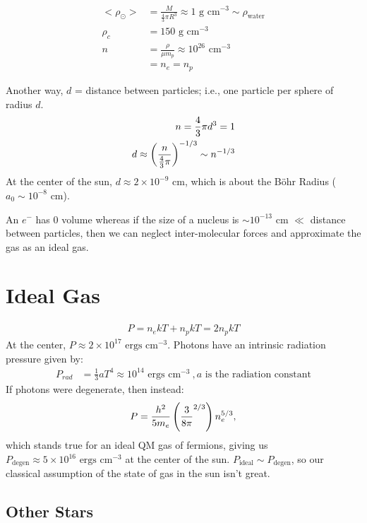\begin{align}
< \rho_\odot> &= \frac{M}{\frac{4}{3}\pi R^3} \approx 1\textrm{ g cm}^{-3}\sim \rho_{\textrm{water}}\\
\rho_c &= 150 \textrm{ g cm}^{-3}\\
n &= \frac{\rho}{\mu m_p} \approx 10^{26} \textrm{ cm}^{-3}\\
&= n_e = n_p
\end{align}

Another way, $d$ = distance between particles; i.e., one particle per sphere of radius $d$. 
\begin{align}
n = \frac{4}{3}\pi d^3 = 1\\
d \approx \left( \frac{n}{\frac{4}{3}\pi }\right)^{-1/3} \sim n^{-1/3}
\end{align}
At the center of the sun, $d \approx 2 \times 10^{-9}$ cm, which is about the B\"ohr Radius ($a_0 \sim 10^{-8}$ cm).

An $e^-$ has 0 volume whereas if the size of a nucleus is $\sim 10^{-13}$ cm $ \ll$ distance between particles, then we can neglect inter-molecular forces and approximate the gas as an ideal gas. 

\section{Ideal Gas}

\begin{align}
P = n_e kT + n_p kT = 2n_p kT
\end{align}
At the center, $P \approx 2 \times 10^{17} \textrm{ ergs cm}^{-3}$. Photons have an intrinsic radiation pressure given by:
\begin{align}
P_{rad} &= \frac{1}{3}aT^4 \approx 10^{14}\textrm{ ergs cm}^{-3}~,a \textrm{ is the radiation constant}
\end{align}
If photons were degenerate, then instead:
\begin{align}
P = \frac{h^2}{5m_e} \left( \frac{3}{8\pi}^{2/3} \right) n_e^{5/3},
\end{align}
which stands true for an ideal QM gas of fermions, giving us $P_{\textrm{degen}} \approx 5 \times 10^{16} \textrm{ ergs cm}^{-3}$ at the center of the sun. $P_{\textrm{ideal}} \sim P_{\textrm{degen}}$, so our classical assumption of the state of gas in the sun isn't great. 

\subsection{Other Stars}

